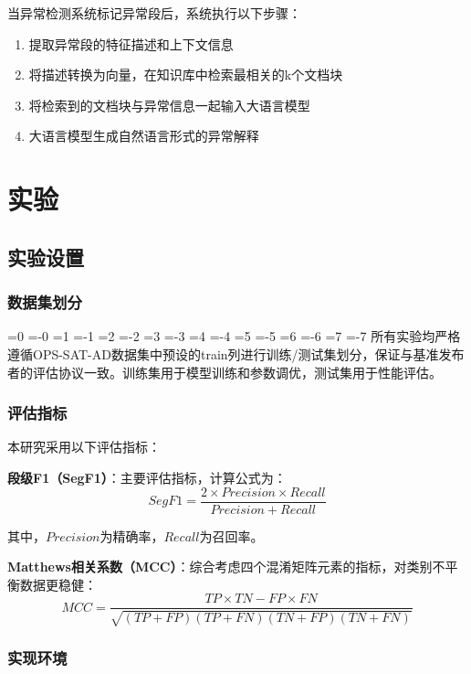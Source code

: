\documentclass[12pt, a4paper]{article}
\newcommand{\zihao}[1]{%
    \ifnum#1=0 {\fontsize{42pt}{50pt}\selectfont}%
    \else\ifnum#1=-0 {\fontsize{36pt}{44pt}\selectfont}%
    \else\ifnum#1=1 {\fontsize{26pt}{32pt}\selectfont}%
    \else\ifnum#1=-1 {\fontsize{24pt}{28pt}\selectfont}%
    \else\ifnum#1=2 {\fontsize{22pt}{26pt}\selectfont}%
    \else\ifnum#1=-2 {\fontsize{18pt}{22pt}\selectfont}%
    \else\ifnum#1=3 {\fontsize{16pt}{20pt}\selectfont}%
    \else\ifnum#1=-3 {\fontsize{15pt}{18pt}\selectfont}%
    \else\ifnum#1=4 {\fontsize{14pt}{17pt}\selectfont}%
    \else\ifnum#1=-4 {\fontsize{12pt}{15pt}\selectfont}%
    \else\ifnum#1=5 {\fontsize{10.5pt}{13pt}\selectfont}%
    \else\ifnum#1=-5 {\fontsize{9pt}{11pt}\selectfont}%
    \else\ifnum#1=6 {\fontsize{7.5pt}{9pt}\selectfont}%
    \else\ifnum#1=-6 {\fontsize{6.5pt}{8pt}\selectfont}%
    \else\ifnum#1=7 {\fontsize{5.5pt}{7pt}\selectfont}%
    \else\ifnum#1=-7 {\fontsize{5pt}{6pt}\selectfont}%
    \fi\fi\fi\fi\fi\fi\fi\fi\fi\fi\fi\fi\fi\fi\fi\fi
}
\newcommand{\songti}{\CJKfontspec{SimSun}}
\begin{document}
当异常检测系统标记异常段后，系统执行以下步骤：
\begin{enumerate}[label=(\arabic*)]
    \item 提取异常段的特征描述和上下文信息
    \item 将描述转换为向量，在知识库中检索最相关的k个文档块
    \item 将检索到的文档块与异常信息一起输入大语言模型
    \item 大语言模型生成自然语言形式的异常解释
\end{enumerate}

\section{实验}

\subsection{实验设置}

\subsubsection{数据集划分}

\zihao{5}\songti
所有实验均严格遵循OPS-SAT-AD数据集中预设的train列进行训练/测试集划分，保证与基准发布者的评估协议一致。训练集用于模型训练和参数调优，测试集用于性能评估。

\subsubsection{评估指标}

本研究采用以下评估指标：

\textbf{段级F1（SegF1）}：主要评估指标，计算公式为：
\begin{equation}
SegF1 = \frac{2 \times Precision \times Recall}{Precision + Recall}
\end{equation}

其中，$Precision$为精确率，$Recall$为召回率。

\textbf{Matthews相关系数（MCC）}：综合考虑四个混淆矩阵元素的指标，对类别不平衡数据更稳健：
\begin{equation}
MCC = \frac{TP \times TN - FP \times FN}{\sqrt{(TP+FP)(TP+FN)(TN+FP)(TN+FN)}}
\end{equation}

\subsubsection{实现环境}
\end{document}
